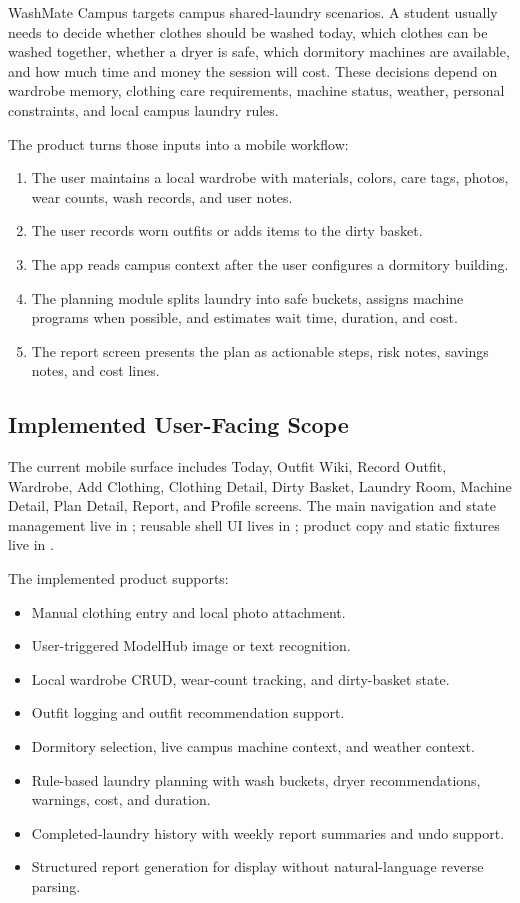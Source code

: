 \documentclass[11pt,a4paper]{article}
\begin{document}
WashMate Campus targets campus shared-laundry scenarios. A student usually needs to decide whether clothes should be washed today, which clothes can be washed together, whether a dryer is safe, which dormitory machines are available, and how much time and money the session will cost. These decisions depend on wardrobe memory, clothing care requirements, machine status, weather, personal constraints, and local campus laundry rules.

The product turns those inputs into a mobile workflow:

\begin{enumerate}
  \item The user maintains a local wardrobe with materials, colors, care tags, photos, wear counts, wash records, and user notes.
  \item The user records worn outfits or adds items to the dirty basket.
  \item The app reads campus context after the user configures a dormitory building.
  \item The planning module splits laundry into safe buckets, assigns machine programs when possible, and estimates wait time, duration, and cost.
  \item The report screen presents the plan as actionable steps, risk notes, savings notes, and cost lines.
\end{enumerate}

\subsection{Implemented User-Facing Scope}

The current mobile surface includes Today, Outfit Wiki, Record Outfit, Wardrobe, Add Clothing, Clothing Detail, Dirty Basket, Laundry Room, Machine Detail, Plan Detail, Report, and Profile screens. The main navigation and state management live in ; reusable shell UI lives in ; product copy and static fixtures live in .

The implemented product supports:

\begin{itemize}
  \item Manual clothing entry and local photo attachment.
  \item User-triggered ModelHub image or text recognition.
  \item Local wardrobe CRUD, wear-count tracking, and dirty-basket state.
  \item Outfit logging and outfit recommendation support.
  \item Dormitory selection, live campus machine context, and weather context.
  \item Rule-based laundry planning with wash buckets, dryer recommendations, warnings, cost, and duration.
  \item Completed-laundry history with weekly report summaries and undo support.
  \item Structured report generation for display without natural-language reverse parsing.
\end{itemize}
\end{document}
